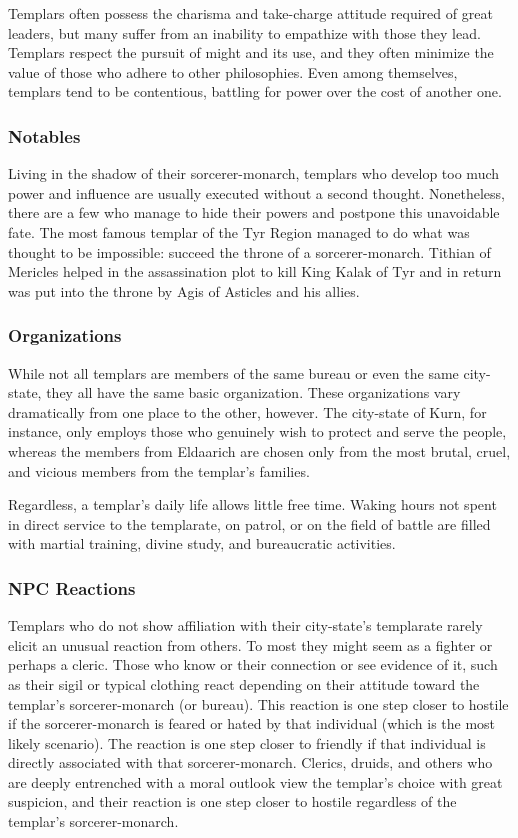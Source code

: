 Templars often possess the charisma and take-charge attitude required of great leaders, but many suffer from an inability to empathize with those they lead. Templars respect the pursuit of might and its use, and they often minimize the value of those who adhere to other philosophies. Even among themselves, templars tend to be contentious, battling for power over the cost of another one.

\subsubsection{Notables}
Living in the shadow of their sorcerer-monarch, templars who develop too much power and influence are usually executed without a second thought. Nonetheless, there are a few who manage to hide their powers and postpone this unavoidable fate. The most famous templar of the Tyr Region managed to do what was thought to be impossible: succeed the throne of a sorcerer-monarch. Tithian of Mericles helped in the assassination plot to kill King Kalak of Tyr and in return was put into the throne by Agis of Asticles and his allies.

\subsubsection{Organizations}
While not all templars are members of the same bureau or even the same city-state, they all have the same basic organization. These organizations vary dramatically from one place to the other, however. The city-state of Kurn, for instance, only employs those who genuinely wish to protect and serve the people, whereas the members from Eldaarich are chosen only from the most brutal, cruel, and vicious members from the templar's families.

Regardless, a templar's daily life allows little free time. Waking hours not spent in direct service to the templarate, on patrol, or on the field of battle are filled with martial training, divine study, and bureaucratic
activities.

\subsubsection{NPC Reactions}
Templars who do not show affiliation with their city-state's templarate rarely elicit an unusual reaction from others. To most they might seem as a fighter or perhaps a cleric. Those who know or their connection or see evidence of it, such as their sigil or typical clothing react depending on their attitude toward the templar's sorcerer-monarch (or bureau). This reaction is one step closer to hostile if the sorcerer-monarch is feared or hated by that individual (which is the most likely scenario). The reaction is one step closer to friendly if that individual is directly associated with that sorcerer-monarch. Clerics, druids, and others who are deeply entrenched with a moral outlook view the templar's choice with great suspicion, and their reaction is one step closer to hostile regardless of the templar's sorcerer-monarch.


